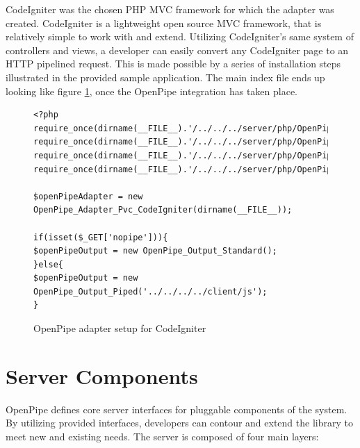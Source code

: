 \documentclass[12pt]{report}
\begin{document}
CodeIgniter was the chosen PHP MVC framework for which the adapter was created. CodeIgniter is a lightweight open source MVC framework, that is relatively simple to work with and extend. Utilizing CodeIgniter’s same system of controllers and views, a developer can easily convert any CodeIgniter page to an HTTP pipelined request. This is made possible by a series of installation steps illustrated in the provided sample application. The main index file ends up looking like figure \ref{fig:codeIgniterPvcCode}, once the OpenPipe integration has taken place.

\begin{figure}[H]
\begin{lstlisting}
<?php
require_once(dirname(__FILE__).'/../../../server/php/OpenPipe/Adapter/Pvc/CodeIgniter.php');
require_once(dirname(__FILE__).'/../../../server/php/OpenPipe/Output/Piped.php');
require_once(dirname(__FILE__).'/../../../server/php/OpenPipe/Output/Standard.php');
require_once(dirname(__FILE__).'/../../../server/php/OpenPipe/Runner.php');

$openPipeAdapter = new OpenPipe_Adapter_Pvc_CodeIgniter(dirname(__FILE__));

if(isset($_GET['nopipe'])){
$openPipeOutput = new OpenPipe_Output_Standard();	
}else{
$openPipeOutput = new OpenPipe_Output_Piped('../../../../client/js');	
}
\end{lstlisting}
\caption{OpenPipe adapter setup for CodeIgniter}
\label{fig:codeIgniterPvcCode}
\end{figure}


\section{Server Components}
OpenPipe defines core server interfaces for pluggable components of the system. By utilizing provided interfaces, developers can contour and extend the library to meet new and existing needs. The server is composed of four main layers:
\end{document}
